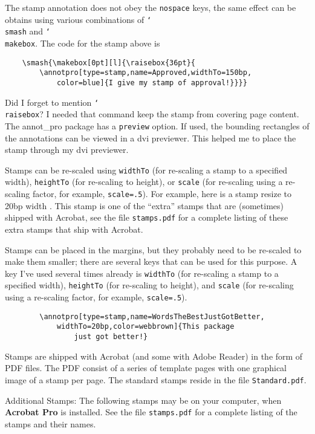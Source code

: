 \documentclass{article}
\newcommand{\cs}[1]{\texttt{\char`\\#1}}
\begin{document}
The stamp annotation does not obey the \texttt{nospace} keys, the same effect can be obtains using
various combinations of \cs{smash} and \cs{makebox}. The code for the stamp above is
\begin{verbatim}
    \smash{\makebox[0pt][l]{\raisebox{36pt}{
        \annotpro[type=stamp,name=Approved,widthTo=150bp,
            color=blue]{I give my stamp of approval!}}}}
\end{verbatim}
Did I forget to mention \cs{raisebox}? I needed that command keep the stamp from covering page content.
The \textsf{annot\_pro} package has a \texttt{preview} option. If used, the bounding rectangles of
the annotations can be viewed in a dvi previewer. This helped me to place the stamp through my dvi previewer.

Stamps can be re-scaled using \texttt{widthTo} (for re-scaling a stamp to a specified width), \texttt{heightTo} (for re-scaling to height),
or \texttt{scale} (for re-scaling using a re-scaling factor, for example, \texttt{scale=.5}).
For example, here is a stamp resize to 20bp width .
This stamp is one of the ``extra'' stamps that are (sometimes) shipped with Acrobat, see the file \texttt{stamps.pdf} for a complete listing
of these extra stamps that ship with Acrobat.

Stamps can be placed in the margins,
but they probably need to be re-scaled to make them smaller; there are several keys that can be used for this purpose.
A key I've used several times already is \texttt{widthTo} (for re-scaling a stamp to a specified width), \texttt{heightTo} (for re-scaling to height),
and \texttt{scale} (for re-scaling using a re-scaling factor, for example, \texttt{scale=.5}).
\begin{verbatim}
        \annotpro[type=stamp,name=WordsTheBestJustGotBetter,
            widthTo=20bp,color=webbrown]{This package
                just got better!}
\end{verbatim}

Stamps are shipped with Acrobat (and some with Adobe Reader) in the form of PDF files. The PDF consist of
a series of template pages with one graphical image of a stamp per page. The standard stamps
reside in the file \texttt{Standard.pdf}.

Additional Stamps: The following stamps may be on your computer, when \textbf{Acrobat Pro} is installed. See the
file \texttt{stamps.pdf} for a complete listing of the stamps and their names.
\end{document}
